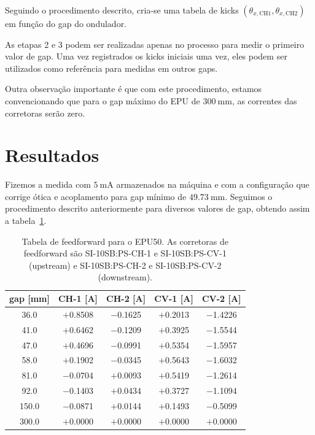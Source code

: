 \documentclass[a4paper,
               keeplastbox,   %
               ]{jacow}
\begin{document}
Seguindo o procedimento descrito, cria-se uma tabela de kicks $\left(\theta_{x, \mathrm{CH1}},\theta_{x, \mathrm{CH2}}\right)$ em função do gap do ondulador.

As etapas 2 e 3 podem ser realizadas apenas no processo para medir o primeiro valor de gap. Uma vez registrados os kicks iniciais uma vez, eles podem ser utilizados como referência para medidas em outros gaps. 

Outra observação importante é que com este procedimento, estamos convencionando que para o gap máximo do EPU de $\SI{300}{\milli\meter}$, as correntes das corretoras serão zero.

\section{Resultados}
Fizemos a medida com $\SI{5}{\milli\ampere}$ armazenados na máquina e com a configuração que corrige ótica e acoplamento para gap mínimo de $\SI{49.73}{\milli\meter}$. Seguimos o procedimento descrito anteriormente para diversos valores de gap, obtendo assim a tabela~\ref{tab:ffwd_table}.

\begin{table}[!h]
\caption{Tabela de feedforward para o EPU50. As corretoras de feedforward são SI-10SB:PS-CH-1 e SI-10SB:PS-CV-1 (upstream) e SI-10SB:PS-CH-2 e SI-10SB:PS-CV-2 (downstream).}
\centering
\begin{tabular}{ccccc}
\hline
\hline
gap {[}mm{]} & CH-1 {[}A{]} & CH-2 {[}A{]} & CV-1 {[}A{]} & CV-2 {[}A{]} \\
\hline\hline
36.0                & $+$0.8508   & $-$0.1625   & $+$0.2013   & $-$1.4226 \\ \hline
41.0                 & $+$0.6462   & $-$0.1209   & $+$0.3925   & $-$1.5544 \\ \hline
47.0                 & $+$0.4696   & $-$0.0991   & $+$0.5354   & $-$1.5957 \\ \hline
58.0                 & $+$0.1902   & $-$0.0345   & $+$0.5643   & $-$1.6032 \\ \hline
81.0                 & $-$0.0704   & $+$0.0093   & $+$0.5419   & $-$1.2614 \\ \hline
92.0                 & $-$0.1403   & $+$0.0434   & $+$0.3727   & $-$1.1094 \\ \hline
150.0                & $-$0.0871   & $+$0.0144   & $+$0.1493   & $-$0.5099 \\ \hline
300.0        & $+$0.0000   & $+$0.0000   & $+$0.0000   & $+$0.0000 \\
\hline
\hline
\end{tabular}
\label{tab:ffwd_table}
\end{table}
\end{document}
